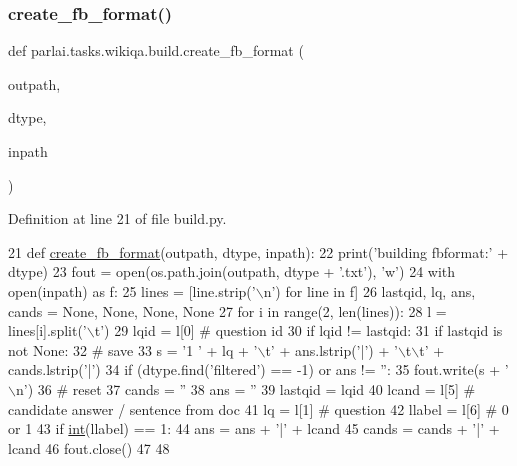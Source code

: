 \subsubsection{\texorpdfstring{create\+\_\+fb\+\_\+format()}{create\_fb\_format()}}
{\footnotesize\ttfamily def parlai.\+tasks.\+wikiqa.\+build.\+create\+\_\+fb\+\_\+format (\begin{DoxyParamCaption}\item[{}]{outpath,  }\item[{}]{dtype,  }\item[{}]{inpath }\end{DoxyParamCaption})}



Definition at line 21 of file build.\+py.


\begin{DoxyCode}
21 \textcolor{keyword}{def }\hyperlink{namespaceparlai_1_1tasks_1_1wikiqa_1_1build_a554828702769592403db58c955d1dfe3}{create\_fb\_format}(outpath, dtype, inpath):
22     print(\textcolor{stringliteral}{'building fbformat:'} + dtype)
23     fout = open(os.path.join(outpath, dtype + \textcolor{stringliteral}{'.txt'}), \textcolor{stringliteral}{'w'})
24     with open(inpath) \textcolor{keyword}{as} f:
25         lines = [line.strip(\textcolor{stringliteral}{'\(\backslash\)n'}) \textcolor{keywordflow}{for} line \textcolor{keywordflow}{in} f]
26     lastqid, lq, ans, cands = \textcolor{keywordtype}{None}, \textcolor{keywordtype}{None}, \textcolor{keywordtype}{None}, \textcolor{keywordtype}{None}
27     \textcolor{keywordflow}{for} i \textcolor{keywordflow}{in} range(2, len(lines)):
28         l = lines[i].split(\textcolor{stringliteral}{'\(\backslash\)t'})
29         lqid = l[0]  \textcolor{comment}{# question id}
30         \textcolor{keywordflow}{if} lqid != lastqid:
31             \textcolor{keywordflow}{if} lastqid \textcolor{keywordflow}{is} \textcolor{keywordflow}{not} \textcolor{keywordtype}{None}:
32                 \textcolor{comment}{# save}
33                 s = \textcolor{stringliteral}{'1 '} + lq + \textcolor{stringliteral}{'\(\backslash\)t'} + ans.lstrip(\textcolor{stringliteral}{'|'}) + \textcolor{stringliteral}{'\(\backslash\)t\(\backslash\)t'} + cands.lstrip(\textcolor{stringliteral}{'|'})
34                 \textcolor{keywordflow}{if} (dtype.find(\textcolor{stringliteral}{'filtered'}) == -1) \textcolor{keywordflow}{or} ans != \textcolor{stringliteral}{''}:
35                     fout.write(s + \textcolor{stringliteral}{'\(\backslash\)n'})
36             \textcolor{comment}{# reset}
37             cands = \textcolor{stringliteral}{''}
38             ans = \textcolor{stringliteral}{''}
39             lastqid = lqid
40         lcand = l[5]  \textcolor{comment}{# candidate answer / sentence from doc}
41         lq = l[1]  \textcolor{comment}{# question}
42         llabel = l[6]  \textcolor{comment}{# 0 or 1}
43         \textcolor{keywordflow}{if} \hyperlink{namespacelanguage__model_1_1eval__ppl_a7d12ee00479673c5c8d1f6d01faa272a}{int}(llabel) == 1:
44             ans = ans + \textcolor{stringliteral}{'|'} + lcand
45         cands = cands + \textcolor{stringliteral}{'|'} + lcand
46     fout.close()
47 
48 
\end{DoxyCode}


